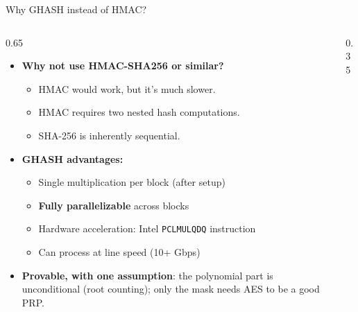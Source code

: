 \ifdefined\PRESENTATION\else\PassOptionsToClass{handout}{beamer}\fi\documentclass[aspectratio=169, lualatex]{beamer}
\begin{document}
\begin{frame}{Why GHASH instead of HMAC?}
	\begin{columns}[c]
		\begin{column}{0.65\textwidth}
			\begin{itemize}
				\item \textbf{Why not use HMAC-SHA256 or similar?}
				      \begin{itemize}
					      \item HMAC would work, but it's much slower.
					      \item HMAC requires two nested hash computations.
					      \item SHA-256 is inherently sequential.
				      \end{itemize}
				\item \textbf{GHASH advantages:}
				      \begin{itemize}
					      \item Single multiplication per block (after setup)
					      \item \textbf{Fully parallelizable} across blocks
					      \item Hardware acceleration: Intel \texttt{PCLMULQDQ} instruction
					      \item Can process at line speed (10+ Gbps)
				      \end{itemize}
				\item \textbf{Provable, with one assumption}: the polynomial part is unconditional (root counting); only the mask needs AES to be a good PRP.
			\end{itemize}
		\end{column}
		\begin{column}{0.35\textwidth}
		\end{column}
	\end{columns}
\end{frame}
\end{document}
